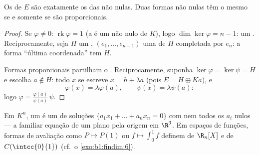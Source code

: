 \begin{theorem}\label{thm:b1:linmaps:hyperplanes}
Os  de $E$ são exatamente os  das 
não nulas. Duas formas não nulas têm o mesmo  se e somente se
são proporcionais.
\end{theorem}

\begin{proof}
Se $\varphi \neq 0$: $\operatorname{rk}\varphi = 1$ (a  é um  não nulo de $K$), logo
$\dim\ker\varphi = n - 1$: um . Reciprocamente, seja $H$ um , $(e_1, \dots, e_{n-1})$
uma  de $H$ completada por $e_n$: a forma ``última coordenada''
tem  $H$.

Formas proporcionais partilham o . Reciprocamente, suponha
$\ker\varphi = \ker\psi = H$ e escolha $a \notin H$: todo $x$ se escreve $x = h + \lambda a$ (pois $E = H \oplus Ka$), e
\[
\varphi(x) = \lambda \varphi(a), \qquad \psi(x) = \lambda\psi(a):
\]
logo $\varphi = \frac{\varphi(a)}{\psi(a)}\,\psi$.
\end{proof}

\begin{example}\label{ex:b1:linmaps:hyperplane}
Em $K^n$, um  é um  de soluções $\{a_1 x_1 + \dots + a_n
x_n = 0\}$ com nem
todos os $a_i$ nulos --- a familiar equação de um plano pela origem
em $\R^3$. Em espaços de funções, formas de avaliação como $P \mapsto P(1)$ ou
$f \mapsto \int_0^1 f$ definem  de $\R_n[X]$ e de $C(\intcc{0}{1})$ (cf.\ o \cref{exo:b1:findim:6}).
\end{example}

